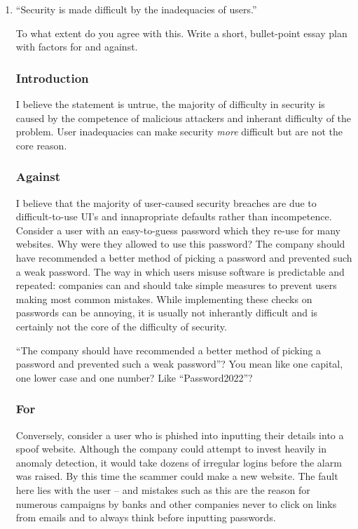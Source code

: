 \documentclass[10pt,\jkfside,a4paper]{article}
\begin{document}
\begin{enumerate}
\begin{enumerate}
\begin{itemize}
\end{itemize}

\end{enumerate}

\item ``Security is made difficult by the inadequacies of users.''

To what extent do you agree with this. Write a short, bullet-point essay plan with factors for and against.

\subsubsection*{Introduction}

I believe the statement is untrue, the majority of difficulty in security is caused by the 
competence of malicious attackers and inherant difficulty of the problem. User inadequacies can 
make security \textit{more} difficult but are not the core reason.

\subsubsection*{Against}

I believe that the majority of user-caused security breaches are due to difficult-to-use UI's and 
innapropriate defaults rather than incompetence. Consider a user with an easy-to-guess password which 
they re-use for many websites. Why were they allowed to use this password? The company should have 
recommended a better method of picking a password and prevented such a weak password. The way in which 
users misuse software is predictable and repeated: companies can and should take simple measures to 
prevent users making most common mistakes. While implementing these checks on passwords can be 
annoying, it is usually not inherantly difficult and is certainly not the core of the difficulty 
of security.

{\color{blue} ``The company should have recommended a better method of picking a password and prevented such a weak
password''? You mean like one capital, one lower case and one number? Like ``Password2022''?}

\subsubsection*{For}

Conversely, consider a user who is phished into inputting their details into a spoof website. 
Although the company could attempt to invest heavily in anomaly detection, it would take dozens 
of irregular logins before the alarm was raised. By this time the scammer could make a new website. 
The fault here lies with the user -- and mistakes such as this are the reason for numerous 
campaigns by banks and other companies never to click on links from emails and to always think 
before inputting passwords.


\end{enumerate}
\end{document}
